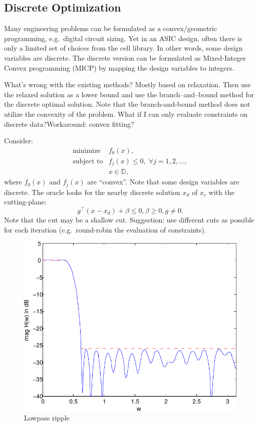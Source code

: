 \documentclass[final,leqno]{siamltex}
\begin{document}
\hypertarget{sec:discrete-optimization}{%
\subsection{Discrete Optimization}\label{sec:discrete-optimization}}

Many engineering problems can be formulated as a convex/geometric programming, e.g.~digital circuit sizing. Yet in an ASIC design, often there is only a limited set of choices from the cell library. In other words, some design variables are discrete. The discrete version can be formulated as Mixed-Integer Convex programming (MICP) by mapping the design variables to integers.

What's wrong with the existing methods? Mostly based on relaxation. Then use the relaxed solution as a lower bound and use the branch--and--bound method for the discrete optimal solution. Note that the branch-and-bound method does not utilize the convexity of the problem. What if I can only evaluate constraints on discrete data?Workaround: convex fitting?

Consider:
\[\begin{array}{ll}
        \text{minimize}      & f_0(x), \\
        \text{subject to}    & f_j(x) \leq 0, \; \forall j=1,2,\ldots, \\
                             & x \in \mathbb{D},
  \end{array}
\]
where \(f_0(x)\) and \(f_j(x)\) are ``convex''. Note that some design variables are discrete. The oracle looks for the nearby discrete solution \(x_d\) of \(x_c\) with the cutting-plane:
\[ g^\top (x - x_d) + \beta \leq 0, \beta \geq 0, g \neq 0.
\]
Note that the cut may be a shallow cut. Suggestion: use different cuts as possible for each iteration (e.g.~round-robin the evaluation of constraints).

\begin{figure}
\hypertarget{fig:lowpass_ripple}{%
\centering
\includegraphics{ellipsoid.files/lowpass_ripple.pdf}
\caption{Lowpass ripple}\label{fig:lowpass_ripple}
}
\end{figure}

\renewcommand\refname{References}

\end{document}
